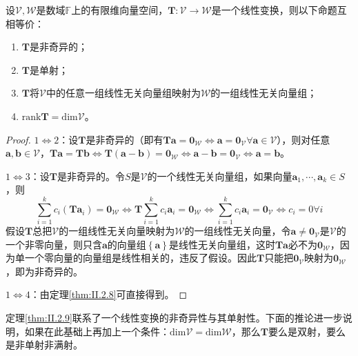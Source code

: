 \documentclass[main.tex]{subfiles}
\begin{document}
\begin{theorem}\label{thm:II.2.9}
    设$\mathcal{V},\mathcal{W}$是数域$\mathbb{F}$上的有限维向量空间，$\mathbf{T}:\mathcal{V}\rightarrow\mathcal{W}$是一个线性变换，则以下命题互相等价：
    \begin{enumerate}
        \item $\mathbf{T}$是非奇异的；
        \item $\mathbf{T}$是单射；
        \item $\mathbf{T}$将$\mathcal{V}$中的任意一组线性无关向量组映射为$\mathcal{W}$的一组线性无关向量组；
        \item $\mathrm{rank}\mathbf{T}=\mathrm{dim}\mathcal{V}$。
    \end{enumerate}
\end{theorem}
\begin{proof}
    $1\Leftrightarrow 2$：设$\mathbf{T}$是非奇异的（即有$\mathbf{Ta}=\mathbf{0}_{\mathcal{W}}\Leftrightarrow\mathbf{a}=\mathbf{0}_{\mathcal{V}}\forall\mathbf{a}\in\mathcal{V}$），则对任意$\mathbf{a},\mathbf{b}\in\mathcal{V}$，$\mathbf{Ta}=\mathbf{Tb}\Leftrightarrow\mathbf{T}\left(\mathbf{a}-\mathbf{b}\right)=\mathbf{0}_{\mathcal{W}}\Leftrightarrow\mathbf{a}-\mathbf{b}=\mathbf{0}_{\mathcal{V}}\Leftrightarrow\mathbf{a}=\mathbf{b}$。

    $1\Leftrightarrow 3$：设$\mathbf{T}$是非奇异的。令$S$是$\mathcal{V}$的一个线性无关向量组，如果向量$\mathbf{a}_1,\cdots,\mathbf{a}_k\in S$，则
    \[
        \sum_{i=1}^kc_i\left(\mathbf{Ta}_i\right)=\mathbf{0}_{\mathcal{W}}\Leftrightarrow\mathbf{T}\sum_{i=1}^kc_i\mathbf{a}_i=\mathbf{0}_{\mathcal{W}}\Leftrightarrow\sum_{i=1}^kc_i\mathbf{a}_i=\mathbf{0}_{\mathcal{V}}\Leftrightarrow c_i=0\forall i
    \]
    假设$\mathbf{T}$总把$\mathcal{V}$的一组线性无关向量映射为$\mathcal{W}$的一组线性无关向量，令$\mathbf{a}\neq\mathbf{0}_{\mathcal{V}}$是$\mathcal{V}$的一个非零向量，则只含$\mathbf{a}$的向量组$\left\{\mathbf{a}\right\}$是线性无关向量组，这时$\mathbf{Ta}$必不为$\mathbf{0}_{\mathcal{W}}$，因为单一个零向量的向量组是线性相关的，违反了假设。因此$\mathbf{T}$只能把$\mathbf{0}_{\mathcal{V}}$映射为$\mathbf{0}_{\mathcal{W}}$，即为非奇异的。

    $1\Leftrightarrow 4$：由定理\ref{thm:II.2.8}可直接得到。
\end{proof}

定理\ref{thm:II.2.9}联系了一个线性变换的非奇异性与其单射性。下面的推论进一步说明，如果在此基础上再加上一个条件：$\mathrm{dim}\mathcal{V}=\mathrm{dim}\mathcal{W}$，那么$\mathbf{T}$要么是双射，要么是非单射非满射。
\end{document}

